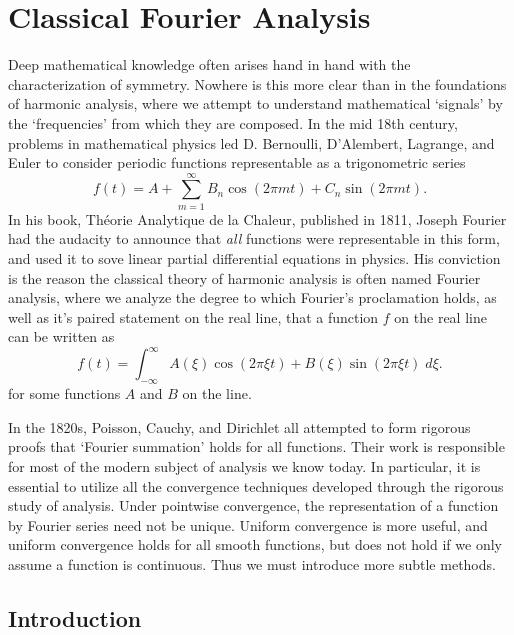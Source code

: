 
\part{Classical Fourier Analysis}

Deep mathematical knowledge often arises hand in hand with the characterization of symmetry. Nowhere is this more clear than in the foundations of harmonic analysis, where we attempt to understand mathematical `signals' by the `frequencies' from which they are composed. In the mid 18th century, problems in mathematical physics led D. Bernoulli, D'Alembert, Lagrange, and Euler to consider periodic functions representable as a trigonometric series
%
\[ f(t) = A + \sum_{m = 1}^\infty B_n \cos(2 \pi mt) + C_n \sin(2 \pi mt). \]
%
In his book, Th\'{e}orie Analytique de la Chaleur, published in 1811, Joseph Fourier had the audacity to announce that {\it all} functions were representable in this form, and used it to sove linear partial differential equations in physics. His conviction is the reason the classical theory of harmonic analysis is often named Fourier analysis, where we analyze the degree to which Fourier's proclamation holds, as well as it's paired statement on the real line, that a function $f$ on the real line can be written as
%
\[ f(t) = \int_{-\infty}^\infty A(\xi) \cos(2 \pi \xi t) + B(\xi) \sin(2 \pi\xi t)\; d\xi. \]
%
for some functions $A$ and $B$ on the line.

In the 1820s, Poisson, Cauchy, and Dirichlet all attempted to form rigorous proofs that `Fourier summation' holds for all functions. Their work is responsible for most of the modern subject of analysis we know today. In particular, it is essential to utilize all the convergence techniques developed through the rigorous study of analysis. Under pointwise convergence, the representation of a function by Fourier series need not be unique. Uniform convergence is more useful, and uniform convergence holds for all smooth functions, but does not hold if we only assume a function is continuous. Thus we must introduce more subtle methods.

\chapter{Introduction}

